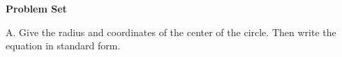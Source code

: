 \def\curdir{/storage/emulated/0/Documents/documents/latex/1920/Grade-10/2nd/equation-and-graph-of-a-circle/fb}

\textbf{Problem Set}

\vspce

A. Give the radius and coordinates of the center of the circle. Then write the equation in standard form. 
\begin{enumerate}[label = \arabic*. ]

\begin{multicols}{3}
\item 
\item 
\item 
\item 
\item 
\item 
\end{multicols} 
\end{enumerate}  
